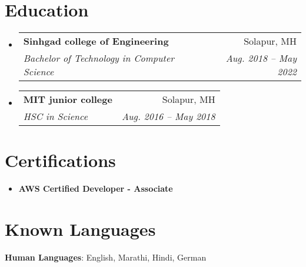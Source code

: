 \documentclass[letterpaper,11pt]{article}
\makeatletter
\newcommand{\resumeSubheading}[4]{
  \vspace{1pt}\item
    \begin{tabular*}{0.97\textwidth}[t]{l@{\extracolsep{\fill}}r}
      \textbf{#1} & #2 \\
      \textit{\large#3} & \textit{\large #4} \\
    \end{tabular*}\vspace{-7pt}
}
\newcommand{\resumeSubHeadingListStart}{\begin{itemize}[leftmargin=0.15in, label={}]}
\newcommand{\resumeSubHeadingListEnd}{\end{itemize}}
\makeatother
\begin{document}
\section{Education}
  \resumeSubHeadingListStart
    \resumeSubheading
      {Sinhgad college of Engineering}{Solapur, MH}
      {Bachelor of Technology in Computer Science}{Aug. 2018 -- May 2022}
    \resumeSubheading
      {MIT junior college}{Solapur, MH}
      {HSC in Science}{Aug. 2016 -- May 2018}
  \resumeSubHeadingListEnd


\section{Certifications}
    \begin{itemize}
        \item \textbf{AWS Certified Developer - Associate}
    \end{itemize}


\section{Known Languages}
 \begin{itemize}[leftmargin=0.15in, label={}]
    \large{\item{
     \textbf{Human Languages}{: English, Marathi, Hindi, German} \\
    }}
 \end{itemize}

\end{document}

